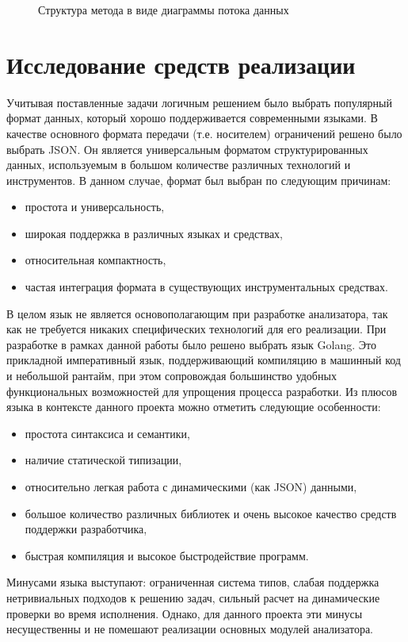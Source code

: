 \begin{figure}[H]
    \centering
    \caption{Структура метода в виде диаграммы потока данных}
    \label{fig:framework}
\end{figure}

\section{Исследование средств реализации}

Учитывая поставленные задачи
логичным решением было выбрать популярный формат данных, который хорошо поддерживается современными
языками. В качестве основного формата передачи (т.е. носителем) ограничений решено было выбрать JSON.
Он является универсальным форматом структурированных данных, используемым в большом количестве
различных технологий и инструментов. В данном случае, формат был выбран по следующим причинам:
\begin{itemize}
    \item простота и универсальность,
    \item широкая поддержка в различных языках и средствах,
    \item относительная компактность,
    \item частая интеграция формата в существующих инструментальных средствах.
\end{itemize}

В целом язык не является основополагающим при разработке анализатора, так как не требуется
никаких специфических технологий для его реализации. При разработке в рамках данной работы
было решено выбрать язык Golang. Это прикладной императивный язык, поддерживающий
компиляцию в машинный код и небольшой рантайм, при этом сопровождая большинство
удобных функциональных возможностей для упрощения процесса разработки.
Из плюсов языка в контексте данного проекта можно отметить следующие особенности:
\begin{itemize}
    \item простота синтаксиса и семантики,
    \item наличие статической типизации,
    \item относительно легкая работа с динамическими (как JSON) данными,
    \item большое количество различных библиотек и очень высокое качество средств поддержки разработчика,
    \item быстрая компиляция и высокое быстродействие программ.
\end{itemize}

Минусами языка выступают: ограниченная система типов, слабая поддержка нетривиальных подходов к решению задач,
сильный расчет на динамические проверки во время исполнения.
Однако, для данного проекта эти минусы несущественны и не помешают реализации
основных модулей анализатора.
\clearpage